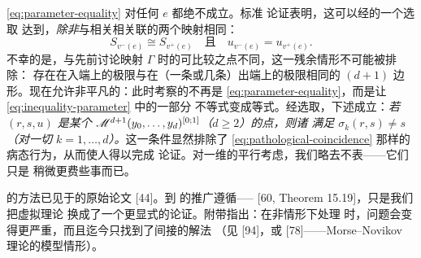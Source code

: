 \eqref{eq:parameter-equality} 对任何\trEdge{} $e$ 都绝不成立。标准%
\trTransversality{}论证表明，这可以经\trPerturbationDatum{}的一个\trGeneric{}选取
达到，\emph{除非}与相关\trVertex{}相关联的两个映射相同：
\begin{equation}\label{eq:pathological-coincidence}
S_{v^-(e)}\cong S_{v^+(e)}
\quad\text{且}\quad
u_{v^-(e)}=u_{v^+(e)}.
\end{equation}
不幸的是，与先前讨论映射 $\Gamma$ 时的可比较之点不同，这一残余情形不可能被排除：
存在在入端上的极限与在（一条或几条）出端上的极限相同的\trRegular\trPseudoholomorphic\trPolygon
$(d{+}1)$ 边形。现在允许非平凡的\trDelayFunction{}：此时考察的不再是
\eqref{eq:parameter-equality}，而是让\eqref{eq:inequality-parameter} 中的一部分
不等式变成等式。经\trGeneric{}选取，下述成立：\emph{若 $(r,s,u)$ 是某个\trModuliSpace{}
$\mathscr{M}^{d+1}(y_0,\ldots,y_d)^{[0;1]}$（$d\ge 2$）的\trIsolated{}点，则诸\trDelayFunction{}
满足 $\sigma_k(r,s)\neq s$（对一切 $k=1,\ldots,d$）。}这一条件显然排除了
\eqref{eq:pathological-coincidence} 那样的病态行为，从而使人得以完成%
\trTransversality{}论证。对一维\trModuliSpace{}的平行考虑，我们略去不表——它们只是
稍微更费些事而已。
\begin{remark}\label{thm:homotopy-method-references}
\trFloerHomology{}的\trHomotopy{}方法已见于\trFloer{}的原始论文 [44]。到\trFukayaCategory{}%
的推广遵循\trFukaya--\trOh--\trOhta--\trOno{} [60, Theorem 15.19]，只是我们把虚拟\trPerturbation{}理论
换成了一个更显式的\trTransversality{}论证。附带指出：在非\trExact{}情形下处理%
\trFloerHomology{}时，\trTransversality{}问题会变得更严重，而且迄今只找到了间接的解法
（见 [94]，或 [78]——Morse--Novikov 理论的模型情形）。
\end{remark}
